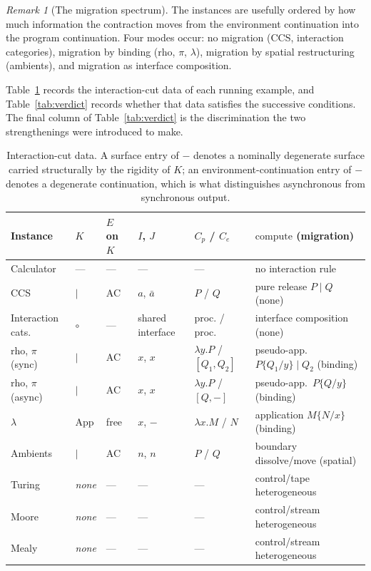 \documentclass[11pt]{article}
\theoremstyle{definition}
\theoremstyle{plain}
\theoremstyle{remark}
\newtheorem{remark}[definition]{Remark}
\newcommand{\compute}{\mathrm{compute}}
\begin{document}
\begin{remark}[The migration spectrum]
\label{rem:migration}
The instances are usefully ordered by how much information the contraction moves from
the environment continuation into the program continuation. Four modes occur: no
migration (CCS, interaction categories), migration by binding (rho, $\pi$, $\lambda$),
migration by spatial restructuring (ambients), and migration as interface composition.
\end{remark}

Table~\ref{tab:cut} records the interaction-cut data of each running example, and
Table~\ref{tab:verdict} records whether that data satisfies the successive conditions.
The final column of Table~\ref{tab:verdict} is the discrimination the two strengthenings
were introduced to make.

\begin{table}[t]
\footnotesize
\centering
\begin{tabular}{@{}lllllp{34mm}@{}}
\toprule
\textbf{Instance} & \textbf{$K$} & \textbf{$E$ on $K$} & \textbf{$I$, $J$} &
\textbf{$C_p$ / $C_e$} & \textbf{$\compute$ (migration)} \\
\midrule
Calculator & --- & --- & --- & --- & no interaction rule \\[2pt]
CCS & ${\mid}$ & AC & $a$, $\bar a$ & $P$ / $Q$ &
  pure release $P \mid Q$ (none) \\[2pt]
Interaction cats. & $\circ$ & --- & shared interface & proc. / proc. &
  interface composition (none) \\[2pt]
rho, $\pi$ (sync) & ${\mid}$ & AC & $x$, $x$ & $\lambda y.P$ / $[Q_1,Q_2]$ &
  pseudo-app.\ $P\{Q_1/y\} \mid Q_2$ (binding) \\[2pt]
rho, $\pi$ (async) & ${\mid}$ & AC & $x$, $x$ & $\lambda y.P$ / $[Q,-]$ &
  pseudo-app.\ $P\{Q/y\}$ (binding) \\[2pt]
$\lambda$ & $\mathrm{App}$ & free & $x$, $-$ & $\lambda x.M$ / $N$ &
  application $M\{N/x\}$ (binding) \\[2pt]
Ambients & ${\mid}$ & AC & $n$, $n$ & $P$ / $Q$ &
  boundary dissolve/move (spatial) \\[2pt]
\midrule
Turing & \emph{none} & --- & --- & --- & control/tape heterogeneous \\[2pt]
Moore & \emph{none} & --- & --- & --- & control/stream heterogeneous \\[2pt]
Mealy & \emph{none} & --- & --- & --- & control/stream heterogeneous \\
\bottomrule
\end{tabular}
\caption{Interaction-cut data. A surface entry of $-$ denotes a nominally degenerate
surface carried structurally by the rigidity of $K$; an environment-continuation entry
of $-$ denotes a degenerate continuation, which is what distinguishes asynchronous from
synchronous output.}
\label{tab:cut}
\end{table}
\end{document}
